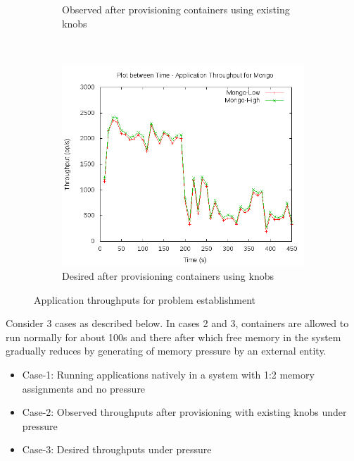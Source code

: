 \begin{figure}[t!]
\begin{subfigure}[t]{0.48\textwidth}
	    \caption{Observed after provisioning containers using existing knobs}
	    \label{plot_intro_observed}
	  \end{subfigure}
	  ~ 
	  \begin{subfigure}[t]{0.48\textwidth}
	    \centering
	    \includegraphics[width=1\textwidth]{images/intro/desired.png}
	    \caption{Desired after provisioning containers using knobs}
	    \label{plot_intro_desired}
	  \end{subfigure}
	  \caption{Application throughputs for problem establishment}
	\end{figure}
	
	Consider 3 cases as described below. In cases 2 and 3, containers are allowed to run normally for about 100s and there after 
which free memory in the system gradually reduces by generating of memory pressure by an external entity. 
	
	\begin{itemize}
	  \item Case-1: Running applications natively in a system with 1:2 memory assignments and no pressure 
	  \item Case-2: Observed throughputs after provisioning with existing knobs under pressure
	  \item Case-3: Desired throughputs under pressure
	\end{itemize}
	
